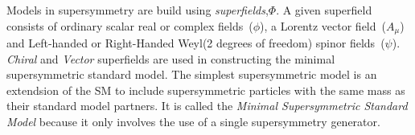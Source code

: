 Models in supersymmetry are build using \textit{superfields},\textbf{$\Phi$}. A given superfield consists of
ordinary scalar real or complex fields~($\phi$), a Lorentz vector field~($ A_{\mu} $) and Left-handed or Right-Handed Weyl(2 degrees of freedom) spinor fields~($\psi$). \textit{Chiral} and \textit{Vector} superfields are used in constructing the minimal supersymmetric standard model.
The simplest supersymmetric model is an extendsion of the SM to include supersymmetric particles with the same mass
as their standard model partners. It is called the \textit{Minimal Supersymmetric Standard Model} because it only involves the 
use of a single supersymmetry generator.

